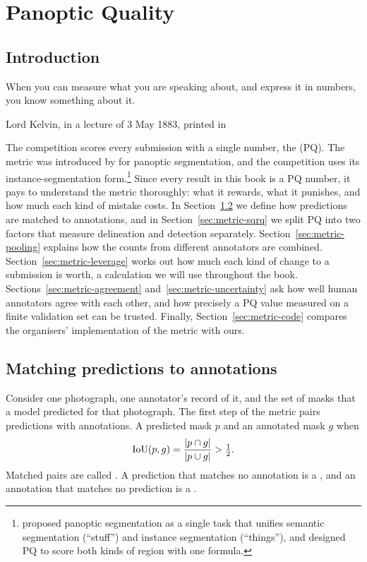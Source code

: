 \chapter{Panoptic Quality}\label{ch:metric}

\section{Introduction}\label{sec:metric-intro}
\epigraph{When you can measure what you are speaking about, and express it in numbers, you know
something about it.}{Lord Kelvin, in a lecture of 3 May 1883, printed in \citet{kelvin1889}}

The competition scores every submission with a single number, the 
(PQ). The metric was introduced by \citet{pq} for panoptic segmentation, and the competition uses
its instance-segmentation form.\footnote{\citet{pq} proposed panoptic segmentation as a single
task that unifies semantic segmentation (``stuff'') and instance segmentation (``things''), and
designed PQ to score both kinds of region with one formula.} Since every result in this book is a PQ number, it pays to
understand the metric thoroughly: what it rewards, what it punishes, and how much each kind of
mistake costs. In Section~\ref{sec:metric-matching} we define how predictions are matched to
annotations, and in Section~\ref{sec:metric-sqrq} we split PQ into two factors that measure
delineation and detection separately. Section~\ref{sec:metric-pooling} explains how the counts
from different annotators are combined. Section~\ref{sec:metric-leverage} works out how much each
kind of change to a submission is worth, a calculation we will use throughout the book.
Sections~\ref{sec:metric-agreement} and~\ref{sec:metric-uncertainty} ask how well human annotators
agree with each other, and how precisely a PQ value measured on a finite validation set can be
trusted. Finally, Section~\ref{sec:metric-code} compares the organisers' implementation of the
metric with ours.

\section{Matching predictions to annotations}\label{sec:metric-matching}
Consider one photograph, one annotator's record of it, and the set of masks that a model predicted
for that photograph. The first step of the metric pairs predictions with annotations. A predicted
mask $p$ and an annotated mask $g$  when
\begin{equation}
\mathrm{IoU}(p,g)=\frac{|p\cap g|}{|p\cup g|}>\tfrac12 .
\end{equation}
Matched pairs are called . A prediction that matches no annotation is a
, and an annotation that matches no prediction is a .

